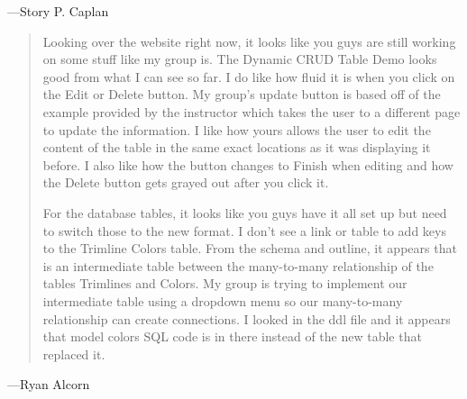 \documentclass[11pt,letterpaper,oneside]{amsart}
\begin{document}
---Story P. Caplan

\begin{quotation}

Looking over the website right now, it looks like you guys are still working on some stuff like my group is. The Dynamic CRUD Table Demo looks good from what I can see so far. I do like how fluid it is when you click on the Edit or Delete button. My group's update button is based off of the example provided by the instructor which takes the user to a different page to update the information. I like how yours allows the user to edit the content of the table in the same exact locations as it was displaying it before. I also like how the button changes to Finish when editing and how the Delete button gets grayed out after you click it.

For the database tables, it looks like you guys have it all set up but need to switch those to the new format. I don't see a link or table to add keys to the Trimline Colors table. From the schema and outline, it appears that is an intermediate table between the many-to-many relationship of the tables Trimlines and Colors. My group is trying to implement our intermediate table using a dropdown menu so our many-to-many relationship can create connections. I looked in the ddl file and it appears that model colors SQL code is in there instead of the new table that replaced it.

\end{quotation}

---Ryan Alcorn
\end{document}
